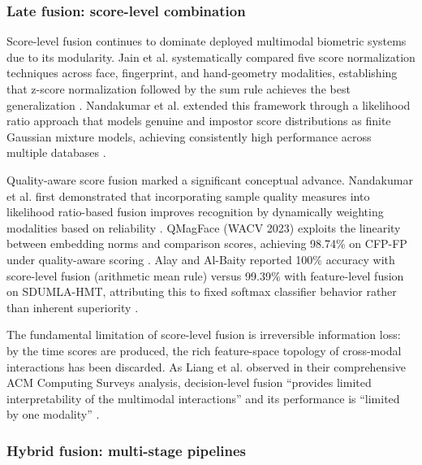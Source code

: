 \documentclass[10pt,journal,compsoc]{IEEEtran}
\begin{document}
\subsubsection{Late fusion: score-level combination}

Score-level fusion continues to dominate deployed multimodal biometric systems due to its modularity. Jain et al. systematically compared five score normalization techniques across face, fingerprint, and hand-geometry modalities, establishing that z-score normalization followed by the sum rule achieves the best generalization \cite{REF1}. Nandakumar et al. extended this framework through a likelihood ratio approach that models genuine and impostor score distributions as finite Gaussian mixture models, achieving consistently high performance across multiple databases \cite{REF4}.

Quality-aware score fusion marked a significant conceptual advance. Nandakumar et al. first demonstrated that incorporating sample quality measures into likelihood ratio-based fusion improves recognition by dynamically weighting modalities based on reliability \cite{REF5}. QMagFace (WACV 2023) exploits the linearity between embedding norms and comparison scores, achieving 98.74\% on CFP-FP under quality-aware scoring \cite{REF21}. Alay and Al-Baity reported 100\% accuracy with score-level fusion (arithmetic mean rule) versus 99.39\% with feature-level fusion on SDUMLA-HMT, attributing this to fixed softmax classifier behavior rather than inherent superiority \cite{REF7}.

The fundamental limitation of score-level fusion is irreversible information loss: by the time scores are produced, the rich feature-space topology of cross-modal interactions has been discarded. As Liang et al. observed in their comprehensive ACM Computing Surveys analysis, decision-level fusion ``provides limited interpretability of the multimodal interactions'' and its performance is ``limited by one modality'' \cite{REF11}.

\subsubsection{Hybrid fusion: multi-stage pipelines}
\end{document}

